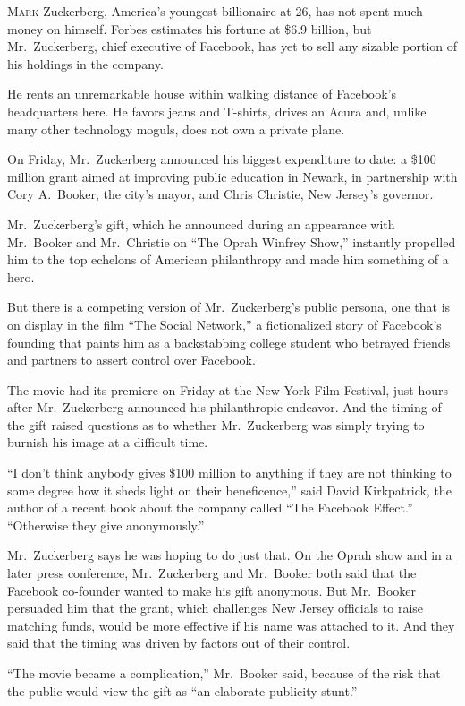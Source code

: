 ﻿\documentclass[12pt]{article}
\begin{document}
\lettrine{M}{ark} Zuckerberg, America's youngest billionaire at 26, has not
spent much money on himself. Forbes estimates his fortune at \$6.9 billion, but Mr.~Zuckerberg,
chief executive of Facebook, has yet to sell any sizable portion of his holdings in the company.

He rents an unremarkable house within walking distance of Facebook's headquarters here. He favors
jeans and T-shirts, drives an Acura and, unlike many other technology moguls, does not own a private
plane.

On Friday, Mr.~Zuckerberg announced his biggest expenditure to date: a \$100 million grant aimed at
improving public education in Newark, in partnership with Cory A.~Booker, the city's mayor, and
Chris Christie, New Jersey's governor.

Mr.~Zuckerberg's gift, which he announced during an appearance with Mr.~Booker and Mr.~Christie on
``The Oprah Winfrey Show,'' instantly propelled him to the top echelons of American philanthropy and
made him something of a hero.

But there is a competing version of Mr.~Zuckerberg's public persona, one that is on display in the
film ``The Social Network,'' a fictionalized story of Facebook's founding that paints him as a
backstabbing college student who betrayed friends and partners to assert control over Facebook.

The movie had its premiere on Friday at the New York Film Festival, just hours after Mr.~Zuckerberg
announced his philanthropic endeavor. And the timing of the gift raised questions as to whether
Mr.~Zuckerberg was simply trying to burnish his image at a difficult time.

``I don't think anybody gives \$100 million to anything if they are not thinking to some degree how
it sheds light on their beneficence,'' said David Kirkpatrick, the author of a recent book about the
company called ``The Facebook Effect.'' ``Otherwise they give anonymously.''

Mr.~Zuckerberg says he was hoping to do just that. On the Oprah show and in a later press
conference, Mr.~Zuckerberg and Mr.~Booker both said that the Facebook co-founder wanted to make his
gift anonymous. But Mr.~Booker persuaded him that the grant, which challenges New Jersey officials
to raise matching funds, would be more effective if his name was attached to it. And they said that
the timing was driven by factors out of their control.

``The movie became a complication,'' Mr.~Booker said, because of the risk that the public would view
the gift as ``an elaborate publicity stunt.''
\end{document}
